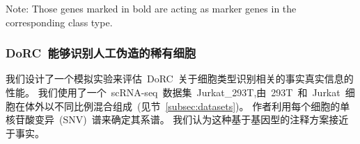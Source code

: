 \begin{table}[htbp]
    \centering
    \caption{The dendritic cell types correspond to class types reported by Villani~\cite{villani2017single}}
    \label{supp-tbl:dendritic}

    \begin{tablenotes}
        \small
        \item Note: Those genes marked in bold are  acting as  marker genes in the corresponding class type.
      \end{tablenotes}

\end{table}

\subsubsection{DoRC~能够识别人工伪造的稀有细胞}
\label{subsec:recplanted} 
我们设计了一个模拟实验来评估~DoRC~关于细胞类型识别相关的事实真实信息的性能。
我们使用了一个~scRNA-seq~数据集~Jurkat\_293T,由~293T~和~Jurkat~细胞在体外以不同比例混合组成~(见节~\ref{subsec:datasets})。
作者利用每个细胞的单核苷酸变异~(SNV)~谱来确定其系谱。
我们认为这种基于基因型的注释方案接近于事实。

